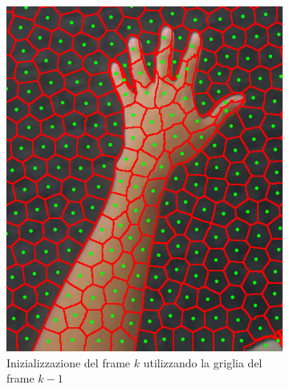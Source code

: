 \documentclass[12pt,a4paper,oneside]{article}
\begin{document}
\begin{figure}[!htb]
\begin{subfigure}[t]{.325\textwidth}
		\includegraphics[width=\textwidth]{resources/images/inizializzazioneFrameAttuale_memory.png}
		\captionsetup{justification=centering}
		\caption{Inizializzazione del frame $k$ utilizzando la griglia del frame \mbox{$k - 1$}}\label{es_init_memory_intermedio}
	\end{subfigure}%
	\hfill
	\begin{subfigure}[t]{.325\textwidth}

\end{subfigure}
\end{figure}
\end{document}
